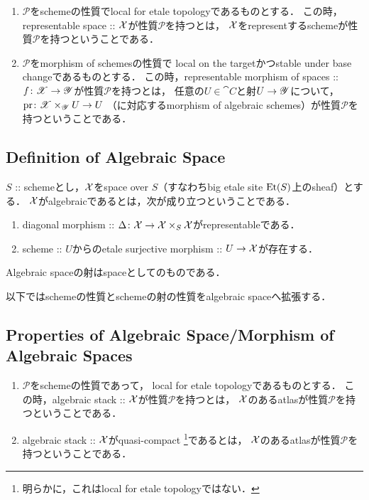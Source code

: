 \documentclass[a4paper, dvipdfmx]{jsarticle}
\newcommand{\Diag}{\Delta}
\begin{document}
    \begin{Def}
        \enumfix
    \begin{enumerate}
    \item
        $\mathcal{P}$をschemeの性質でlocal for etale topologyであるものとする．
        この時，representable space :: $\mathcal{X}$が性質$\mathcal{P}$を持つとは，
        $\mathcal{X}$をrepresentするschemeが性質$\mathcal{P}$を持つということである．

    \item
        $\mathcal{P}$をmorphism of schemesの性質で
        local on the targetかつstable under base changeであるものとする．
        この時，representable morphism of spaces :: $f \colon \mathscr{X} \to \mathscr{Y}$が性質$\mathcal{P}$を持つとは，
        任意の$U \in \cat{C}$と射$U \to \mathscr{Y}$について，
        $\operatorname{pr} \colon \mathscr{X} \times_{\mathscr{Y}} U \to U$
        （に対応するmorphism of algebraic schemes）が性質$\mathcal{P}$を持つということである．
    \end{enumerate}
    \end{Def}

\subsection{Definition of Algebraic Space}
    \begin{Def}
        $S$ :: schemeとし，$\mathcal{X}$をspace over $S$（すなわちbig etale site $\mathrm{Et}(S)$上のsheaf）とする．
        $\mathcal{X}$がalgebraicであるとは，次が成り立つということである．
    \begin{enumerate}
        \item diagonal morphism :: $\Diag \colon \shX \to \shX \times_{S} \shX$がrepresentableである．
        \item scheme :: $U$からのetale surjective morphism :: $U \to \mathcal{X}$が存在する．
    \end{enumerate}
        Algebraic spaceの射はspaceとしてのものである．
    \end{Def}
    
以下ではschemeの性質とschemeの射の性質をalgebraic spaceへ拡張する．

\subsection{Properties of Algebraic Space/Morphism of Algebraic Spaces}
    \begin{Def}
        \enumfix
    \begin{enumerate}
    \item
        $\mathcal{P}$をschemeの性質であって，
        local for etale topologyであるものとする．
        この時，algebraic stack :: $\mathcal{X}$が性質$\mathcal{P}$を持つとは，
        $\mathcal{X}$のあるatlasが性質$\mathcal{P}$を持つということである．

    \item
        algebraic stack :: $\mathcal{X}$がquasi-compact
        \footnote{ 明らかに，これはlocal for etale topologyではない． }であるとは，
        $\mathcal{X}$のあるatlasが性質$\mathcal{P}$を持つということである．
    \end{enumerate}
    \end{Def}
\end{document}
